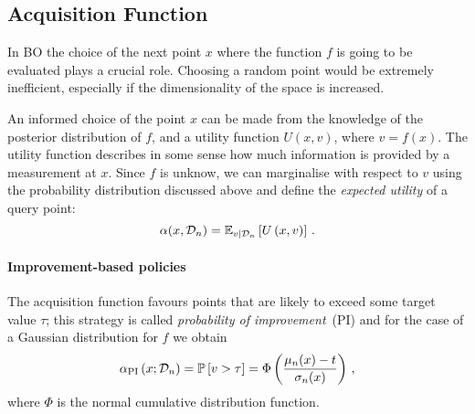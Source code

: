 \subsection{Acquisition Function}
\label{sec:AcqFun}

In BO the choice of the next point $x$ where the function $f$ is going to be
evaluated plays a crucial role. Choosing a random point would be extremely
inefficient, especially if the dimensionality of the space is increased. 

An informed choice of the point $x$ can be made from the knowledge of the
posterior distribution of $f$, and a utility function $U(x,v)$, where $v=f(x)$.
The utility function describes in some sense how much information is provided by
a measurement at $x$. Since $f$ is unknow, we can marginalise with respect to
$v$ using the probability distribution discussed above and define the {\em
expected utility} of a query point:
\begin{equation}
    \label{eq:ExpUtilDef}
    \alpha(x,\mathcal{D}_n) = \mathbb{E}_{v|\mathcal{D}_n}\left[U\left(x,v\right)\right]\, .
\end{equation} 

\paragraph[]{Improvement-based policies}

The acquisition function favours points that are likely to exceed some target value $\tau$; this strategy is called {\em probability of improvement}\ (PI) and for the case of a Gaussian distribution for $f$ we obtain
\begin{equation}
    \label{eq:AlphaPI}
    \alpha_{\mathrm{PI}}\left(x;\mathcal{D}_n\right) = 
    \mathbb{P}\left[v>\tau\right] = 
    \Phi\left(
        \frac{\mu_n(x)-t}{\sigma_n(x)}    
    \right)\, ,
\end{equation}
where $\Phi$ is the normal cumulative distribution function. 
